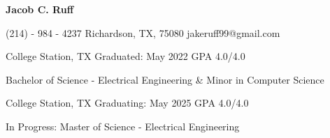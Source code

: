 \documentclass[11pt]{article} %
\begin{document}
\centerline{{\Huge \bf Jacob C. Ruff}}

\bigskip

	{(214) - 984 - 4237}
        {Richardson, TX, 75080}
        {jakeruff99@gmail.com}

\begin{description}
\squish
{}
           {College Station, TX}
           {Graduated: May 2022}
	   {GPA 4.0/4.0}


	   Bachelor of Science - Electrical Engineering \& 	Minor in Computer Science


           {College Station, TX}
           {Graduating: May 2025}
	   {GPA 4.0/4.0}

In Progress: Master of Science - Electrical Engineering



\end{description}
\end{document}
